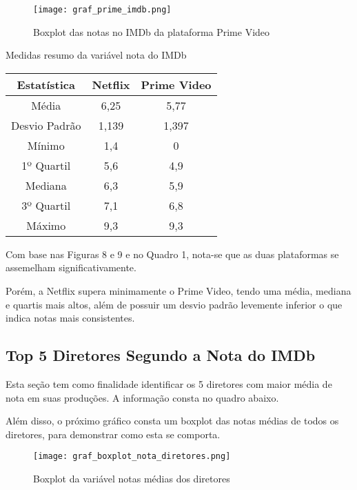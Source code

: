 \documentclass[a4paper, 12pt]{article} %
\begin{document}
\begin{figure}[H]
\cantering
\caption{Boxplot das notas no IMDb da plataforma Prime Video}
\label{box_uni}
\texttt{[image: graf\_prime\_imdb.png]}
\end{figure}

\begin{quadro}[H]
\centering
\label{quadro_resumo1}
\caption{Medidas resumo da variável nota do IMDb}
\begin{tabular}{|c|c|c|} \hline
\textbf{Estatística} & \textbf{Netflix} & \textbf{Prime Video}\\ \hline
Média         & 6,25  & 5,77 \\
Desvio Padrão & 1,139 & 1,397 \\
Mínimo        & 1,4  & 0 \\
1º Quartil    & 5,6  & 4,9 \\
Mediana       & 6,3 & 5,9 \\
3º Quartil    & 7,1 & 6,8 \\
Máximo        & 9,3 & 9,3 \\ \hline
\end{tabular}
\label{quadro_resumo2}
\end{quadro}

Com base nas Figuras 8 e 9 e no Quadro 1, nota-se que as duas plataformas se assemelham significativamente.

Porém, a Netflix supera minimamente o Prime Video, tendo uma média, mediana e quartis mais altos, além de possuir um desvio padrão levemente inferior o que indica notas mais consistentes.




\subsection{Top 5 Diretores Segundo a Nota do IMDb}

Esta seção tem como finalidade identificar os 5 diretores com maior média de nota em suas produções. A informação consta no quadro abaixo.

Além disso, o próximo gráfico consta um boxplot das notas médias de todos os diretores, para demonstrar como esta se comporta.

\begin{figure}[H]
\cantering
\caption{Boxplot da variável notas médias dos diretores}
\label{box_uni2}
\texttt{[image: graf\_boxplot\_nota\_diretores.png]}
\end{figure}
\end{document}
